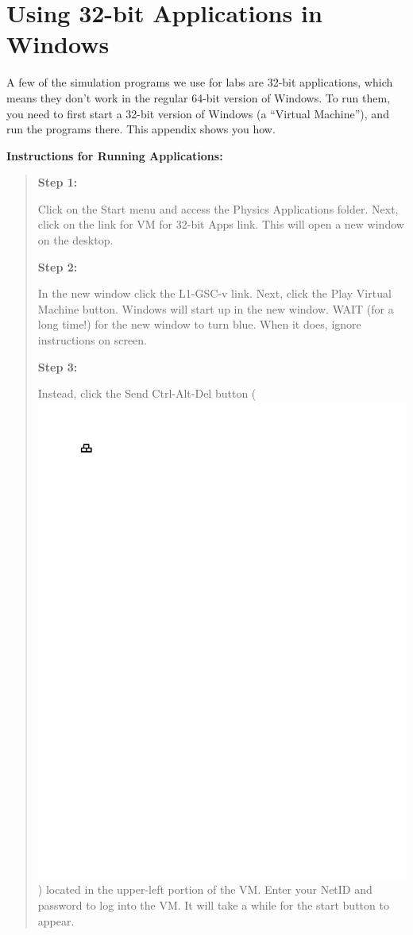 ﻿\section{Using 32-bit Applications in Windows}
\label{virtual_machine}

A few of the simulation programs we use for labs are 32-bit applications, which means they don't work in the regular 64-bit version of Windows.  To run them, you need to first start a 32-bit version of Windows (a ``Virtual Machine''), and run the programs there.  This appendix shows you how.

\bigskip\textbf{Instructions for Running Applications:}

\begin{quote}
\textbf{Step 1:}
 
Click on the Start menu and access the Physics Applications folder.  Next, click on the link for VM for 32-bit Apps link.  This will open a new window on the desktop.

\medskip\textbf{Step 2:}

In the new window click the L1-GSC-v link.  Next, click the Play Virtual Machine button.  Windows will start up in the new window.   WAIT (for a long time!) for the new window to turn blue.  When it does, ignore instructions on screen. 

\medskip\textbf{Step 3:} 

Instead, click the Send Ctrl-Alt-Del button 
(\includegraphics{appendices/virtual_machine/ctrl_alt_del.pdf}) 
located in the upper-left portion of the VM.  Enter your NetID and password to log into the VM.  It will take a while for the start button to appear.


\end{quote}
